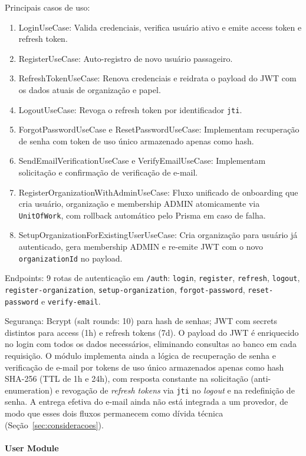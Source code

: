 Principais casos de uso:
\begin{enumerate}
\item LoginUseCase: Valida credenciais, verifica usuário ativo e emite access token e refresh token.
\item RegisterUseCase: Auto-registro de novo usuário passageiro.
\item RefreshTokenUseCase: Renova credenciais e reidrata o payload do JWT com os dados atuais de organização e papel.
\item LogoutUseCase: Revoga o refresh token por identificador \texttt{jti}.
\item ForgotPasswordUseCase e ResetPasswordUseCase: Implementam recuperação de senha com token de uso único armazenado apenas como hash.
\item SendEmailVerificationUseCase e VerifyEmailUseCase: Implementam solicitação e confirmação de verificação de e-mail.
\item RegisterOrganizationWithAdminUseCase: Fluxo unificado de onboarding que cria usuário, organização e membership ADMIN atomicamente via \texttt{UnitOfWork}, com rollback automático pelo Prisma em caso de falha.
\item SetupOrganizationForExistingUserUseCase: Cria organização para usuário já autenticado, gera membership ADMIN e re-emite JWT com o novo \texttt{organizationId} no payload.
\end{enumerate}

Endpoints: 9 rotas de autenticação em \texttt{/auth}: \texttt{login}, \texttt{register}, \texttt{refresh}, \texttt{logout}, \texttt{register-organization}, \texttt{setup-organization}, \texttt{forgot-password}, \texttt{reset-password} e \texttt{verify-email}.

Segurança: Bcrypt (salt rounds: 10) para hash de senhas; JWT com secrets distintos para access (1h) e refresh tokens (7d). O payload do JWT é enriquecido no login com todos os dados necessários, eliminando consultas ao banco em cada requisição. O módulo implementa ainda a lógica de recuperação de senha e verificação de e-mail por tokens de uso único armazenados apenas como hash SHA-256 (TTL de 1h e 24h), com resposta constante na solicitação (anti-enumeration) e revogação de \textit{refresh tokens} via \texttt{jti} no \textit{logout} e na redefinição de senha. A entrega efetiva do e-mail ainda não está integrada a um provedor, de modo que esses dois fluxos permanecem como dívida técnica (Seção~\ref{sec:consideracoes}).

\paragraph{User Module}

